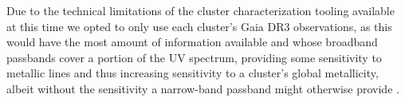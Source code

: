 Due to the technical limitations of the cluster characterization tooling available at this time we opted to only use each cluster's Gaia DR3 observations, as this would have the most amount of information available and whose broadband passbands cover a portion of the UV spectrum, providing some sensitivity to metallic lines and thus increasing sensitivity to a cluster's global metallicity, albeit without the sensitivity a narrow-band passband might otherwise provide \autocite{paunzenCalibrationGaiaDR32026}.